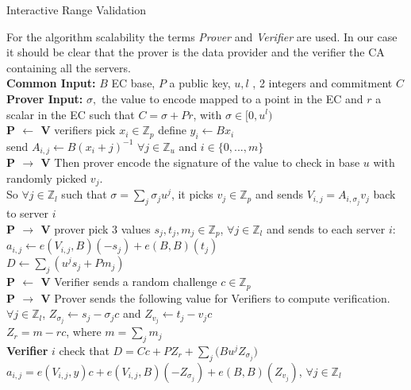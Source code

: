 \documentclass{article}
\begin{document}
\begin{algorithm}[H]
\caption{Interactive Range Validation}\label{euclid}
\begin{algorithmic}[1]

\State For the algorithm scalability the terms \textit{Prover} and \textit{Verifier} are used. In our case it should be clear that the prover is the data provider and the verifier the CA containing all the servers.\\
\State \textbf{Common Input:} $B$ EC base,  $P$ a public key, $ u, l$ , 2 integers and commitment $C$
\State \textbf{Prover Input:} 
$\sigma,$ the value to encode mapped to a point in the EC and $r$ a scalar in the EC such that $C = \sigma + Pr$, with $\sigma \in [0,u^l)$\\
\State  \textbf{P $\leftarrow$ V} verifiers pick $x_i \in \mathbb{Z}_p$ define $y_i \gets Bx_i$\\
send $A_{i,j} \gets B(x_i+j)^{-1}$ $ \forall j \in \mathbb{Z}_u$ and $ i \in \{0,...,m\}$\\
\State \textbf{P $\rightarrow$ V} Then prover encode the signature of the value to check in base $u$ with randomly picked $v_j$.\\
So $\forall j \in \mathbb{Z}_l $ such that $ \sigma = \sum_{j}{\sigma_j u^j}$, it picks $v_j \in \mathbb{Z}_p$ and sends $V_{i,j} = A_{i,\sigma_j}v_j$ back to server $i$\\
\State \textbf{P $\rightarrow$ V} prover pick 3 values $s_j,t_j,m_j \in \mathbb{Z}_p $, $\forall j \in \mathbb{Z}_l$ and sends to each server $i$:\\
$a_{i,j} \gets e(V_{i,j},B)(-s_j)+e(B,B)(t_j)$\\
$D \gets \sum_{j}{(u^j s_j + Pm_j)}$\\
\State \textbf{P $\leftarrow$ V} Verifier sends a random challenge $c \in \mathbb{Z}_p$\\
\State \textbf{P $\rightarrow$ V} Prover sends the following value for Verifiers to compute verification.\\
$ \forall j \in \mathbb{Z}_l$, $Z_{\sigma_j} \gets s_j-\sigma_j c$ and $Z_{v_j} \gets t_j-v_j c$\\
$Z_r = m -rc $, where $m = \sum_{j}{m_j}$\\
\State \textbf{Verifier} $i$ check that $D = Cc + PZ_r + \sum_{j}{(Bu^j Z_{\sigma_j}}) $\\
$a_{i,j} = e(V_{i,j},y)c + e(V_{i,j},B)(-Z_{\sigma_j}) + e(B,B)(Z_{v_j})$, $\forall j \in \mathbb{Z}_l$
\end{algorithmic}
\end{algorithm}
\end{document}
